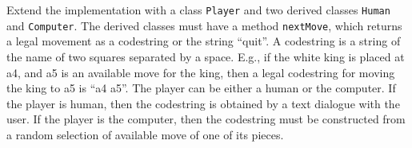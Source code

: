 Extend the implementation with a class \lstinline{Player} and two derived classes \lstinline{Human} and \lstinline{Computer}. The derived classes must have a method \lstinline{nextMove}, which returns a legal movement as a codestring or the string ``quit''.  A codestring is a string of the name of two squares separated by a space. E.g., if the white king is placed at a4, and a5 is an available move for the king, then a legal codestring for moving the king to a5 is ``a4 a5''. The player can be either a human or the computer. If the player is human, then the codestring is obtained by a text dialogue with the user. If the player is the computer, then the codestring must be constructed from a random selection of available move of one of its pieces.
